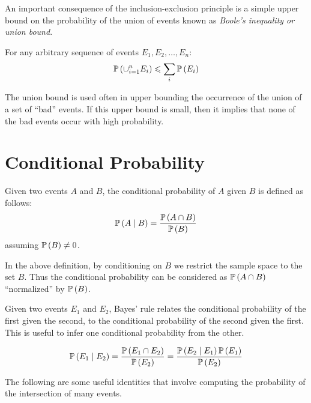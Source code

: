 An important consequence of the inclusion-exclusion principle is a simple upper bound on the probability
of the union of events known as \emph{Boole's inequality or union bound}.

\begin{theorem}\label{thm:boole}
    For any
    arbitrary sequence of events $E_1, E_2, \dots, E_n$:
    \[\operatorname{\mathbb{P}}\left(\cup_{i=1}^nE_i\right) \leqslant \sum_i \operatorname{\mathbb{P}}\left(E_i\right)\]
\end{theorem}

The union bound is used often in upper bounding the occurrence of the union of a set of ``bad'' events. If this upper bound is small,
then it implies that none of the bad events occur with high probability.


\section{Conditional Probability}

\begin{definition}
    Given two events $A$ and $B$, the conditional probability of $A$ given $B$ is defined as follows:
    \[\operatorname{\mathbb{P}}\left(A \mid B\right) = \frac{\operatorname{\mathbb{P}}\left(A\cap B\right)}{\operatorname{\mathbb{P}}\left(B\right)}\]
    assuming $\operatorname{\mathbb{P}}\left(B\right) \neq 0$.
\end{definition}

In the above definition, by conditioning on $B$ we restrict the sample space to the set $B$.
Thus the conditional probability can be considered as  $\operatorname{\mathbb{P}}\left(A \cap B\right)$ ``normalized'' by $\operatorname{\mathbb{P}}\left(B\right)$.

Given two events $E_1$ and $E_2$, Bayes' rule relates the conditional probability of the first given the second,
to the conditional probability of the second given the first. This is useful to infer one conditional probability from the other.
\begin{theorem}
    \[\operatorname{\mathbb{P}}\left(E_1 \mid E_2\right)=\frac{\operatorname{\mathbb{P}}\left(E_1 \cap E_2\right)}{\operatorname{\mathbb{P}}\left(E_2\right)} = \frac{\operatorname{\mathbb{P}}\left(E_2 \mid E_1\right)\operatorname{\mathbb{P}}\left(E_1\right)}{\operatorname{\mathbb{P}}\left(E_2\right)}\]
\end{theorem}

The following are some useful identities that involve computing the probability of the intersection of many events.

